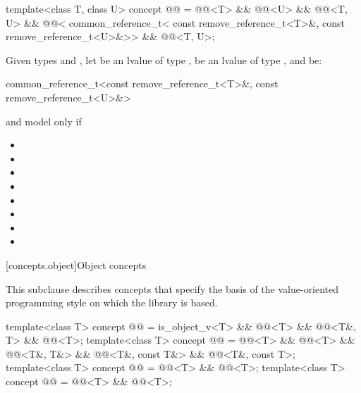 \begin{itemdecl}
template<class T, class U>
  concept @@ =
    @@<T> && @@<U> &&
    @@<T, U> &&
    @@<
      common_reference_t<
        const remove_reference_t<T>&,
        const remove_reference_t<U>&>> &&
    @@<T, U>;
\end{itemdecl}

\begin{itemdescr}
\pnum
Given types  and ,
let  be an lvalue of type ,
 be an lvalue of type ,
and  be:
\begin{codeblock}
common_reference_t<const remove_reference_t<T>&, const remove_reference_t<U>&>
\end{codeblock}
 and  model
 only if
\begin{itemize}
\item {}
\item {}
\item {}
\item {}
\item {}
\item {}
\item {}
\item {}
\end{itemize}
\end{itemdescr}

[concepts.object]{Object concepts}

\pnum
This subclause describes concepts that specify the basis of the
value-oriented programming style on which the library is based.

\begin{itemdecl}
template<class T>
  concept @@ = is_object_v<T> && @@<T> &&
                    @@<T&, T> && @@<T>;
template<class T>
  concept @@ = @@<T> && @@<T> && @@<T&, T&> &&
                     @@<T&, const T&> && @@<T&, const T>;
template<class T>
  concept @@ = @@<T> && @@<T>;
template<class T>
  concept @@ = @@<T> && @@<T>;
\end{itemdecl}


